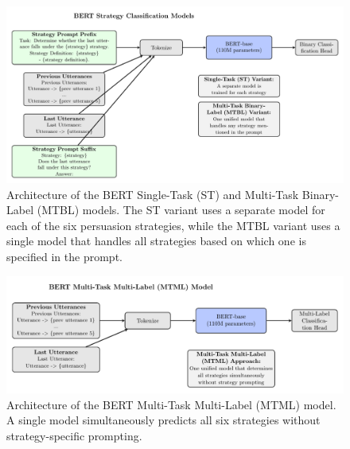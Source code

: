 \documentclass{article}
\begin{document}
\begin{figure}[H]
    \centering
    \includegraphics[width=\textwidth]{figures/pdf/bert_st_and_mtbl.pdf}
    \caption{Architecture of the BERT Single-Task (ST) and Multi-Task Binary-Label (MTBL) models. The ST variant uses a separate model for each of the six persuasion strategies, while the MTBL variant uses a single model that handles all strategies based on which one is specified in the prompt.}
    \label{fig:bert_st_and_mtbl}
\end{figure}

\begin{figure}[H]
    \centering
    \includegraphics[width=\textwidth]{figures/pdf/bert_mtml.pdf}
    \caption{Architecture of the BERT Multi-Task Multi-Label (MTML) model. A single model simultaneously predicts all six strategies without strategy-specific prompting.}
    \label{fig:bert_mtml}
\end{figure}
\end{document}
